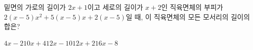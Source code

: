 밑면의 가로의 길이가 $2x+1$이고 세로의 길이가 $x+2$인 직육면체의 부피가 $2(x-5)x^2+5(x-5)x+2(x-5)$일 때, 이 직육면체의 모든 모서리의 길이의 합은?
\begin{choices32}{$4x-2$}{$10x+4$}{$12x-10$}{$12x+2$}{$16x-8$}\end{choices32}
